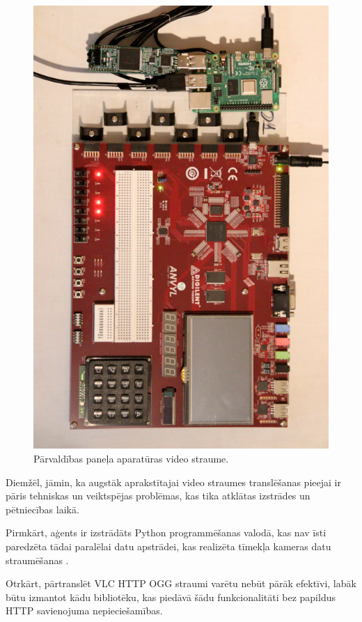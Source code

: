 \begin{figure}[H]
    \includegraphics[width=0.9\linewidth]{assets/webcam-usage.jpg}
    \centering
    \caption{Pārvaldības paneļa aparatūras video straume.}
    \label{fig:hwstream}
\end{figure}

Diemžēl, jāmin, ka augstāk aprakstītajai video straumes translēšanas pieejai ir
pāris tehniskas un veiktspējas problēmas, kas tika atklātas izstrādes un
pētniecības laikā.

Pirmkārt, aģents ir izstrādāts Python programmēšanas valodā, kas nav īsti
paredzēta tādai paralēlai datu apstrādei, kas realizēta tīmekļa kameras datu
straumēšanas .

Otrkārt, pārtranslēt VLC HTTP OGG straumi varētu nebūt pārāk efektīvi, labāk
būtu izmantot kādu bibliotēku, kas piedāvā šādu funkcionalitāti bez papildus
HTTP savienojuma nepieciešamības.

